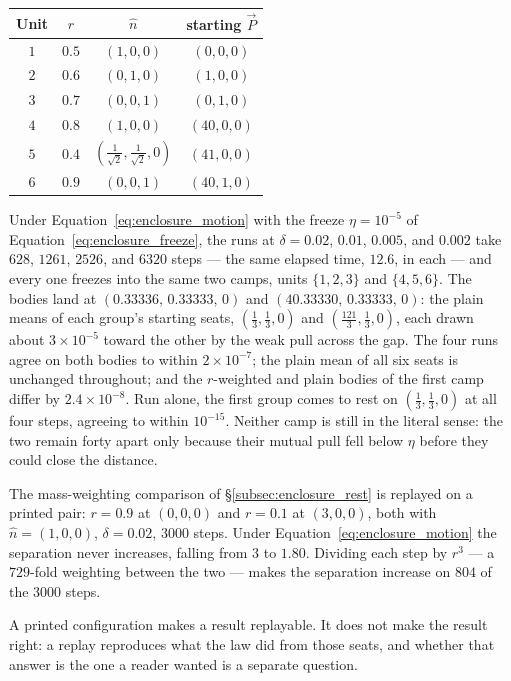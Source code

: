 \documentclass[12pt, a4paper]{article}
\begin{document}
\begin{center}
\begin{tabular}{cccc}
Unit & $r$ & $\hat n$ & starting $\vec P$ \\
\hline
$1$ & $0.5$ & $(1,0,0)$ & $(0,0,0)$ \\
$2$ & $0.6$ & $(0,1,0)$ & $(1,0,0)$ \\
$3$ & $0.7$ & $(0,0,1)$ & $(0,1,0)$ \\
$4$ & $0.8$ & $(1,0,0)$ & $(40,0,0)$ \\
$5$ & $0.4$ & $(\tfrac{1}{\sqrt2},\tfrac{1}{\sqrt2},0)$ & $(41,0,0)$ \\
$6$ & $0.9$ & $(0,0,1)$ & $(40,1,0)$ \\
\end{tabular}
\end{center}

Under Equation~\eqref{eq:enclosure_motion} with the freeze
$\eta=10^{-5}$ of Equation~\eqref{eq:enclosure_freeze}, the runs at
$\delta=0.02$, $0.01$, $0.005$, and $0.002$ take $628$, $1261$,
$2526$, and $6320$ steps --- the same elapsed time, $12.6$, in each
--- and every one freezes into the same two camps, units $\{1,2,3\}$
and $\{4,5,6\}$. The bodies land at
$(0.33336,\,0.33333,\,0)$ and $(40.33330,\,0.33333,\,0)$: the plain
means of each group's starting seats, $(\tfrac13,\tfrac13,0)$ and
$(\tfrac{121}{3},\tfrac13,0)$, each drawn about $3\times10^{-5}$
toward the other by the weak pull across the gap. The four runs agree
on both bodies to within $2\times10^{-7}$; the plain mean of all six
seats is unchanged throughout; and the $r$-weighted and plain bodies
of the first camp differ by $2.4\times10^{-8}$. Run alone, the first
group comes to rest on $(\tfrac13,\tfrac13,0)$ at all four steps,
agreeing to within $10^{-15}$. Neither camp is still in the
literal sense: the two remain forty apart only because their mutual
pull fell below $\eta$ before they could close the distance.

The mass-weighting comparison of \S\ref{subsec:enclosure_rest} is
replayed on a printed pair: $r=0.9$ at $(0,0,0)$ and $r=0.1$ at
$(3,0,0)$, both with $\hat n=(1,0,0)$, $\delta=0.02$, $3000$ steps.
Under Equation~\eqref{eq:enclosure_motion} the separation never
increases, falling from $3$ to $1.80$. Dividing each step by $r^3$ ---
a $729$-fold weighting between the two --- makes the separation
increase on $804$ of the $3000$ steps.

A printed configuration makes a result replayable. It does not make
the result right: a replay reproduces what the law did from those
seats, and whether that answer is the one a reader wanted is a
separate question.
\end{document}
